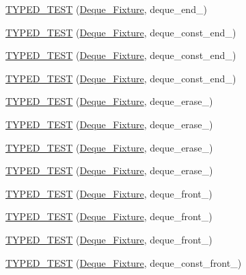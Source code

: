 \begin{DoxyCompactItemize}
\item 
\hyperlink{TestDeque_8c_09_09_ac547609d1477293cf15411f62660f6be}{T\-Y\-P\-E\-D\-\_\-\-T\-E\-S\-T} (\hyperlink{structDeque__Fixture}{Deque\-\_\-\-Fixture}, deque\-\_\-end\-\_)
\item 
\hyperlink{TestDeque_8c_09_09_a67f5163a4145402404dcb900e1089492}{T\-Y\-P\-E\-D\-\_\-\-T\-E\-S\-T} (\hyperlink{structDeque__Fixture}{Deque\-\_\-\-Fixture}, deque\-\_\-const\-\_\-end\-\_)
\item 
\hyperlink{TestDeque_8c_09_09_a368a9eb0e85ef4a46ccb48c7b717e28f}{T\-Y\-P\-E\-D\-\_\-\-T\-E\-S\-T} (\hyperlink{structDeque__Fixture}{Deque\-\_\-\-Fixture}, deque\-\_\-const\-\_\-end\-\_)
\item 
\hyperlink{TestDeque_8c_09_09_aceaeed322a2f95a9f62ac05cdaff3def}{T\-Y\-P\-E\-D\-\_\-\-T\-E\-S\-T} (\hyperlink{structDeque__Fixture}{Deque\-\_\-\-Fixture}, deque\-\_\-const\-\_\-end\-\_)
\item 
\hyperlink{TestDeque_8c_09_09_a92cf1359c90b32bf80f698ae8e293ea6}{T\-Y\-P\-E\-D\-\_\-\-T\-E\-S\-T} (\hyperlink{structDeque__Fixture}{Deque\-\_\-\-Fixture}, deque\-\_\-erase\-\_)
\item 
\hyperlink{TestDeque_8c_09_09_a0150cb5b815b9e34670220b0030b38ad}{T\-Y\-P\-E\-D\-\_\-\-T\-E\-S\-T} (\hyperlink{structDeque__Fixture}{Deque\-\_\-\-Fixture}, deque\-\_\-erase\-\_)
\item 
\hyperlink{TestDeque_8c_09_09_acb5a4bd1e567edc56d343e0a84eb451b}{T\-Y\-P\-E\-D\-\_\-\-T\-E\-S\-T} (\hyperlink{structDeque__Fixture}{Deque\-\_\-\-Fixture}, deque\-\_\-erase\-\_)
\item 
\hyperlink{TestDeque_8c_09_09_ae3e616087c801ba2df9d1c021b375185}{T\-Y\-P\-E\-D\-\_\-\-T\-E\-S\-T} (\hyperlink{structDeque__Fixture}{Deque\-\_\-\-Fixture}, deque\-\_\-erase\-\_)
\item 
\hyperlink{TestDeque_8c_09_09_a8e5093526d51104b4b02e7072585ee95}{T\-Y\-P\-E\-D\-\_\-\-T\-E\-S\-T} (\hyperlink{structDeque__Fixture}{Deque\-\_\-\-Fixture}, deque\-\_\-front\-\_)
\item 
\hyperlink{TestDeque_8c_09_09_ad9bcc8dbb81d6a48bfd9f2cbeeb985ca}{T\-Y\-P\-E\-D\-\_\-\-T\-E\-S\-T} (\hyperlink{structDeque__Fixture}{Deque\-\_\-\-Fixture}, deque\-\_\-front\-\_)
\item 
\hyperlink{TestDeque_8c_09_09_aa25c6363316e0eaeffe24c23b8652b21}{T\-Y\-P\-E\-D\-\_\-\-T\-E\-S\-T} (\hyperlink{structDeque__Fixture}{Deque\-\_\-\-Fixture}, deque\-\_\-front\-\_)
\item 
\hyperlink{TestDeque_8c_09_09_a3a0fcf21a5d7df1a227370173f65c5c4}{T\-Y\-P\-E\-D\-\_\-\-T\-E\-S\-T} (\hyperlink{structDeque__Fixture}{Deque\-\_\-\-Fixture}, deque\-\_\-const\-\_\-front\-\_)

\end{DoxyCompactItemize}
